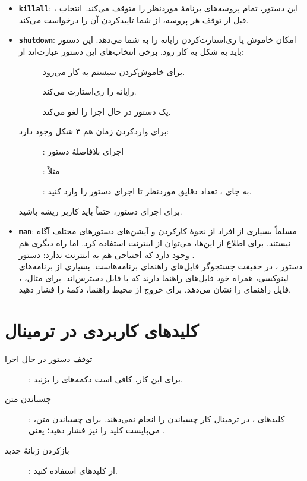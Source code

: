 \begin{itemize}
\item \textbf{\texttt{\Large killall}}: این دستور، تمام پروسه‌های برنامهٔ موردنظر را متوقف می‌کند. انتخاب ، قبل از توقف هر پروسه، از شما تاییدکردن آن را درخواست می‌کند.

\item \textbf{\texttt{\Large shutdown}}: امکان خاموش یا ری‌استارت‌کردن رایانه را به شما می‌دهد. این دستور باید به شکل  به کار رود. برخی انتخاب‌های این دستور عبارت‌اند از:
\begin{description}
\item[] برای خاموش‌کردن سیستم به کار می‌رود.

\item[] رایانه را ری‌استارت می‌کند.

\item[] یک دستور  در حال اجرا را لغو می‌کند.
\end{description}
برای واردکردن زمان هم ۳ شکل وجود دارد:
\begin{description}
\item[]: اجرای بلافاصلهٔ دستور

\item[]: مثلاً 

\item[]: به جای ، تعداد دقایق موردنظر تا اجرای دستور را وارد کنید.
\end{description}
برای اجرای دستور، حتماً باید کاربر ریشه باشید.

\item \textbf{\texttt{\Large man}}: مسلماً بسیاری از افراد از نحوهٔ کارکردن و آپشن‌های دستورهای مختلف آگاه نیستند. برای اطلاع از این‌ها، می‌توان از اینترنت استفاده کرد. اما راه دیگری هم وجود دارد که احتیاجی هم به اینترنت ندارد: دستور .\\
دستور ، در حقیقت جستجوگر فایل‌های راهنمای برنامه‌هاست. بسیاری از برنامه‌های لینوکسی، همراه خود فایل‌های راهنما دارند که با  قابل دسترس‌اند. برای مثال، ، فایل راهنمای  را نشان می‌دهد. برای خروج از محیط راهنما، دکمهٔ  را فشار دهید.
\end{itemize}

\section{کلیدهای کاربردی در ترمینال}
\begin{description}
\item[توقف دستور در حال اجرا]: برای این کار، کافی است دکمه‌های  را بزنید.

\item[چسباندن متن]: کلیدهای ، در ترمینال کار چسباندن را انجام نمی‌دهند. برای چسباندن متن، می‌بایست کلید  را نیز فشار دهید؛ یعنی .

\item[بازکردن زبانهٔ جدید]: از کلیدهای  استفاده کنید.
\end{description}
